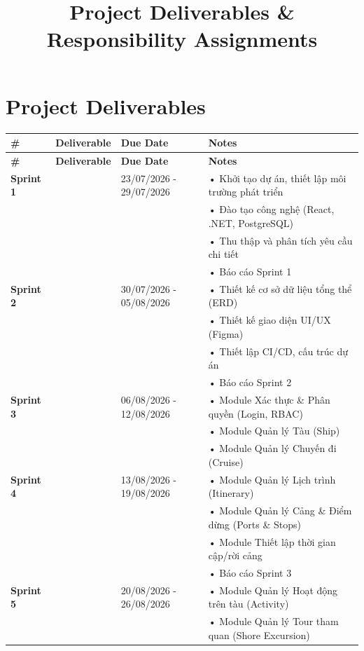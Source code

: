 \documentclass[a4paper,12pt]{article}
\title{\textbf{Project Deliverables \& Responsibility Assignments}}
\author{}
\date{}
\begin{document}
	
	\maketitle
	
	\section{Project Deliverables}
	
	\begin{longtable}{p{1cm} p{5cm} p{4cm} p{6cm}}
		\toprule
		\textbf{\#} & \textbf{Deliverable} & \textbf{Due Date} & \textbf{Notes} \\
		\midrule
		\endfirsthead
		\toprule
		\textbf{\#} & \textbf{Deliverable} & \textbf{Due Date} & \textbf{Notes} \\
		\midrule
		\endhead
		\bottomrule
		\endfoot
		\textbf{Sprint 1} & & 23/07/2026 - 29/07/2026 & • Khởi tạo dự án, thiết lập môi trường phát triển \\
		& & & • Đào tạo công nghệ (React, .NET, PostgreSQL) \\
		& & & • Thu thập và phân tích yêu cầu chi tiết \\
		& & & • Báo cáo Sprint 1 \\
		\midrule
		\textbf{Sprint 2} & & 30/07/2026 - 05/08/2026 & • Thiết kế cơ sở dữ liệu tổng thể (ERD) \\
		& & & • Thiết kế giao diện UI/UX (Figma) \\
		& & & • Thiết lập CI/CD, cấu trúc dự án \\
		& & & • Báo cáo Sprint 2 \\
		\midrule
		\textbf{Sprint 3} & & 06/08/2026 - 12/08/2026 & • Module Xác thực \& Phân quyền (Login, RBAC) \\
		& & & • Module Quản lý Tàu (Ship) \\
		& & & • Module Quản lý Chuyến đi (Cruise) \\
		\midrule
		\textbf{Sprint 4} & & 13/08/2026 - 19/08/2026 & • Module Quản lý Lịch trình (Itinerary) \\
		& & & • Module Quản lý Cảng \& Điểm dừng (Ports \& Stops) \\
		& & & • Module Thiết lập thời gian cập/rời cảng \\
		& & & • Báo cáo Sprint 3 \\
		\midrule
		\textbf{Sprint 5} & & 20/08/2026 - 26/08/2026 & • Module Quản lý Hoạt động trên tàu (Activity) \\
		& & & • Module Quản lý Tour tham quan (Shore Excursion) \\

\end{longtable}
\end{document}
